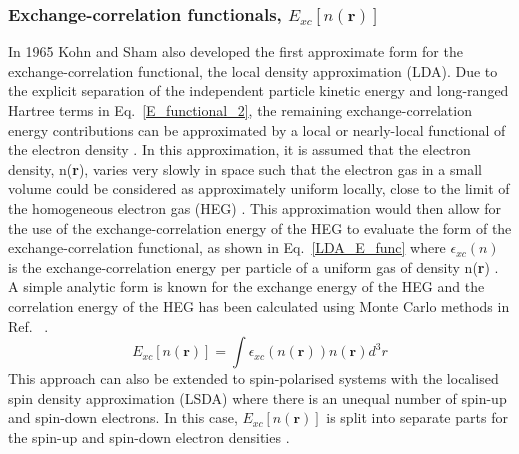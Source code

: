 \documentclass[11pt, twoside]{report}
\begin{document}



\subsubsection{Exchange-correlation functionals, $E_{xc}[n(\textbf{r})]$}
In 1965 Kohn and Sham also developed the first approximate form for the exchange-correlation functional, the local density approximation (LDA). Due to the explicit separation of the independent particle kinetic energy and long-ranged Hartree terms in Eq.~\ref{E_functional_2}, the remaining exchange-correlation energy contributions can be approximated by a local or nearly-local functional of the electron density \cite{RichardMartin_Ch7}. In this approximation, it is assumed that the electron density, n(\textbf{r}), varies very slowly in space such that the electron gas in a small volume could be considered as approximately uniform locally, close to the limit of the homogeneous electron gas (HEG) \cite{RichardMartin_Ch8}. This approximation would then allow for the use of the exchange-correlation energy of the HEG to evaluate the form of the exchange-correlation functional, as shown in Eq.~\ref{LDA_E_func} where $\epsilon_{xc}(n)$ is the exchange-correlation energy per particle of a uniform gas of density n(\textbf{r}) \cite{Prasad_ch3}. A simple analytic form is known for the exchange energy of the HEG and the correlation energy of the HEG has been calculated using Monte Carlo methods in Ref.~ \cite{RichardMartin_Ch8}.
\begin{equation}\label{LDA_E_func}
E_{xc}[n(\mathbf{r})] = \int \epsilon_{xc}(n(\mathbf{r}))n(\mathbf{r})d^3r
\end{equation}
This approach can also be extended to spin-polarised systems with the localised spin density approximation (LSDA) where there is an unequal number of spin-up and spin-down electrons. In this case, $E_{xc}[n(\mathbf{r})]$ is split into separate parts for the spin-up and spin-down electron densities \cite{Prasad_ch3}.
\end{document}
